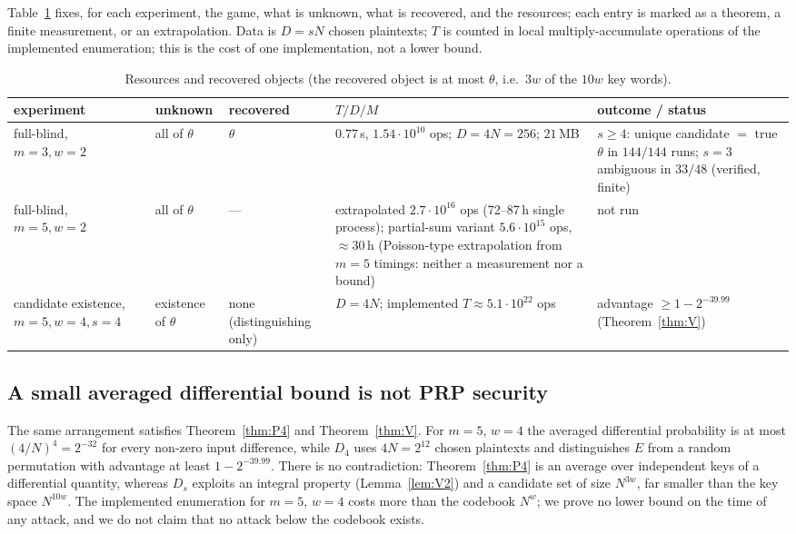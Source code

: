 Table~\ref{tab:tdm} fixes, for each experiment, the game, what is unknown, what is recovered, and the
resources; each entry is marked as a theorem, a finite measurement, or an extrapolation. Data is $D=sN$ chosen plaintexts; $T$ is counted in local multiply-accumulate operations of
the implemented enumeration; this is the cost of one implementation, not a lower bound.
\begin{table}[ht]\small
\caption{Resources and recovered objects (the recovered object is at most $\theta$, i.e.\ $3w$ of the $10w$ key words).}\label{tab:tdm}
\begin{tabular}{p{}p{}p{}p{}p{}}
\toprule
experiment & unknown & recovered & $T/D/M$ & outcome / status\\
\midrule
full-blind, $m=3,w=2$ & all of $\theta$ & $\theta$ & $0.77$\,s, $1.54\cdot10^{10}$ ops; $D=4N=256$; $21$\,MB & $s\ge4$: unique candidate $=$ true $\theta$ in $144/144$ runs; $s=3$ ambiguous in $33/48$ (verified, finite)\\
full-blind, $m=5,w=2$ & all of $\theta$ & --- & extrapolated $2.7\cdot10^{16}$ ops (72--87\,h single process); partial-sum variant $5.6\cdot10^{15}$ ops, $\approx30$\,h (Poisson-type extrapolation from $m=5$ timings: neither a measurement nor a bound) & not run\\
candidate existence, $m=5,w=4,s=4$ & existence of $\theta$ & none (dis\-tin\-guish\-ing only) & $D=4N$; implemented $T\approx5.1\cdot10^{22}$ ops & advantage $\ge1-2^{-39.99}$ (Theorem~\ref{thm:V})\\
\bottomrule
\end{tabular}
\end{table}

\subsection{A small averaged differential bound is not PRP security}
The same arrangement satisfies Theorem~\ref{thm:P4} and Theorem~\ref{thm:V}. For $m=5$, $w=4$ the averaged
differential probability is at most $(4/N)^4=2^{-32}$ for every non-zero input difference, while $D_4$
uses $4N=2^{12}$ chosen plaintexts and distinguishes $E$ from a random permutation with advantage at
least $1-2^{-39.99}$. There is no contradiction: Theorem~\ref{thm:P4} is an average over independent keys
of a differential quantity, whereas $D_s$ exploits an integral property (Lemma~\ref{lem:V2}) and a
candidate set of size $N^{3w}$, far smaller than the key space $N^{10w}$. The implemented enumeration
for $m=5$, $w=4$ costs more than the codebook $N^w$; we prove no lower bound on the time of any
attack, and we do not claim that no attack below the codebook exists.

